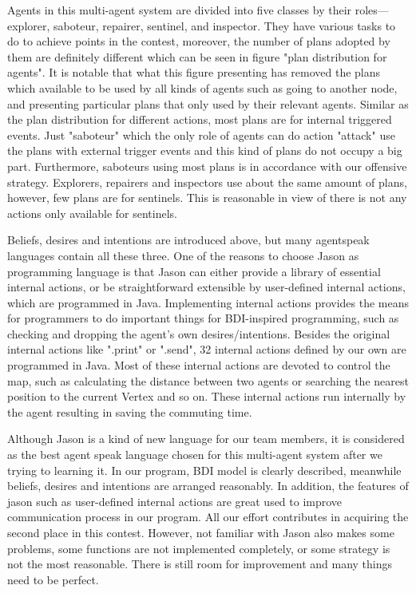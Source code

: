 Agents in this multi-agent system are divided into five classes by their roles---explorer, saboteur, repairer, sentinel, and inspector. They have various tasks to do to achieve points in the contest, moreover, the number of plans adopted by them are definitely different which can be seen in figure "plan distribution for agents". It is notable that what this figure presenting has removed the plans which available to be used by all kinds of agents such as going to another node, and presenting particular plans that only used by their relevant agents. Similar as the plan distribution for different actions, most plans are for internal triggered events. Just "saboteur" which the only role of agents can do action "attack" use the plans with external trigger events and this kind of plans do not occupy a big part. Furthermore, saboteurs using most plans is in accordance with our offensive strategy. Explorers, repairers and inspectors use about the same amount of plans, however, few plans are for sentinels. This is reasonable in view of there is not any actions only available for sentinels.

Beliefs, desires and intentions are introduced above, but many agentspeak languages contain all these three. One of the reasons to choose Jason as programming language is that Jason can either provide a library of essential internal actions, or be straightforward extensible by user-defined internal actions, which are programmed in Java\cite{rafael_Javabased_2007}. Implementing internal actions provides the means for programmers to do important things for BDI-inspired programming, such as checking and dropping the agent’s own
desires/intentions\cite{rafael_overviewjason_2006}. Besides the original internal actions like ".print" or ".send", 32 internal actions defined by our own are programmed in Java. Most of these internal actions are devoted to control the map, such as calculating the distance between two agents or searching the nearest position to the current Vertex and so on. These internal actions run internally by the agent resulting in saving the commuting time.

Although Jason is a kind of new language for our team members, it is considered as the best agent speak language chosen for this multi-agent system after we trying to learning it. In our program, BDI model is clearly described, meanwhile beliefs, desires and intentions are arranged reasonably. In addition, the features of jason such as user-defined internal actions are great used to improve communication process in our program. All our effort contributes in acquiring the second place in this contest. However, not familiar with Jason also makes some problems, some functions are not implemented completely, or some strategy is not the most reasonable. There is still room for improvement and many things need to be perfect.
